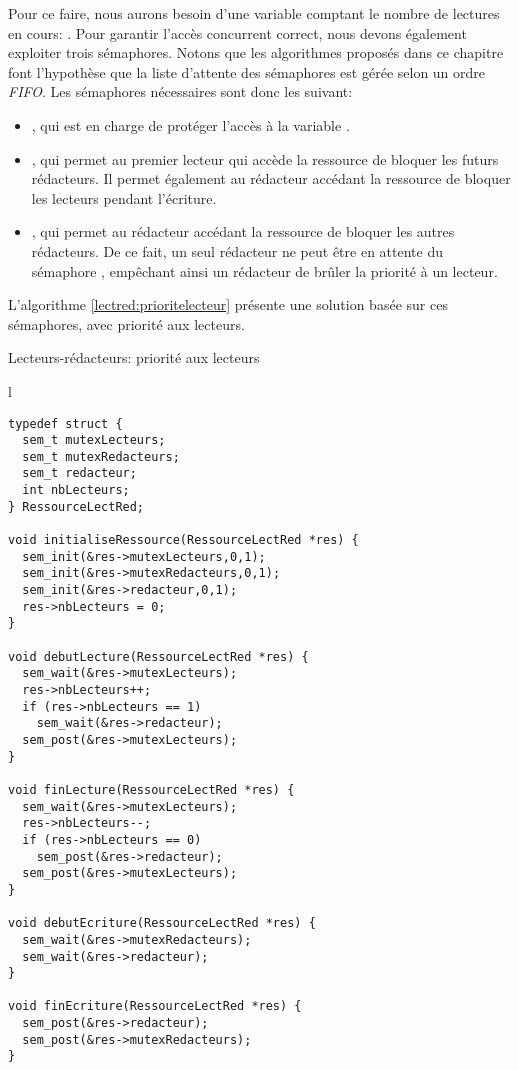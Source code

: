 Pour ce faire, nous aurons besoin d'une variable comptant le nombre de lectures en cours: . Pour garantir l'accès concurrent correct, nous devons également exploiter trois sémaphores. Notons que les algorithmes proposés dans ce chapitre font l'hypothèse que la liste d'attente des sémaphores est gérée selon un ordre \textit{FIFO}. Les sémaphores nécessaires sont donc les suivant:

\begin{itemize}
\item {}, qui est en charge de protéger l'accès à la variable .
\item {}, qui permet au premier lecteur qui accède la ressource de bloquer les futurs rédacteurs. Il permet également au rédacteur accédant la ressource de bloquer les lecteurs pendant l'écriture.
\item {}, qui permet au rédacteur accédant la ressource de bloquer les autres rédacteurs. De ce fait, un seul rédacteur ne peut être en attente du sémaphore , empêchant ainsi un rédacteur de brûler la priorité à un lecteur.
\end{itemize}

L'algorithme \ref{lectred:prioritelecteur} présente une solution basée sur ces sémaphores, avec priorité aux lecteurs.


\begin{algorithm}[h!tp]
\caption{Lecteurs-rédacteurs: priorité aux lecteurs}\label{lectred:prioritelecteur}
\centering
\begin{tabular}{l}
\lstset{language=C++}
\begin{lstlisting}
typedef struct {
  sem_t mutexLecteurs;
  sem_t mutexRedacteurs;
  sem_t redacteur;
  int nbLecteurs;
} RessourceLectRed;

void initialiseRessource(RessourceLectRed *res) {
  sem_init(&res->mutexLecteurs,0,1);
  sem_init(&res->mutexRedacteurs,0,1);
  sem_init(&res->redacteur,0,1);
  res->nbLecteurs = 0;
}

void debutLecture(RessourceLectRed *res) {
  sem_wait(&res->mutexLecteurs);
  res->nbLecteurs++;
  if (res->nbLecteurs == 1)
    sem_wait(&res->redacteur);
  sem_post(&res->mutexLecteurs);
}

void finLecture(RessourceLectRed *res) {
  sem_wait(&res->mutexLecteurs);
  res->nbLecteurs--;
  if (res->nbLecteurs == 0)
    sem_post(&res->redacteur);
  sem_post(&res->mutexLecteurs);
}

void debutEcriture(RessourceLectRed *res) {
  sem_wait(&res->mutexRedacteurs);
  sem_wait(&res->redacteur);
}

void finEcriture(RessourceLectRed *res) {
  sem_post(&res->redacteur);
  sem_post(&res->mutexRedacteurs);
}
\end{lstlisting}
\end{tabular}

\end{algorithm}

